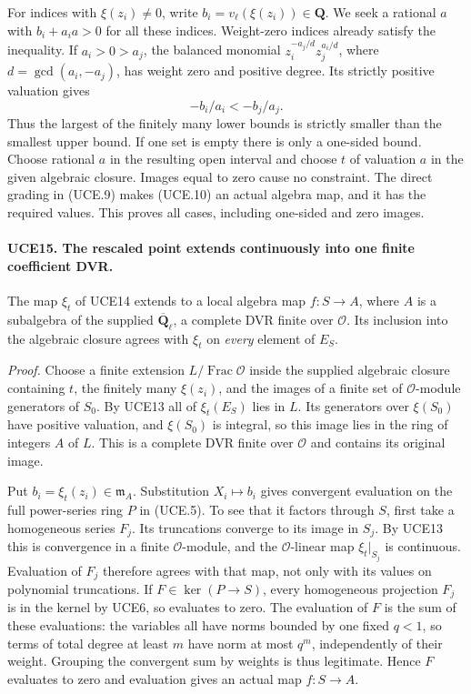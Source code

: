 For indices with \(\xi(z_i)\ne0\), write
\(b_i=v_\ell(\xi(z_i))\in\mathbf Q\).  We seek a rational
\(a\) with \(b_i+a_i a>0\) for all these indices.  Weight-zero
indices already satisfy the inequality.  If \(a_i>0>a_j\), the
balanced monomial
\(z_i^{-a_j/d}z_j^{a_i/d}\), where \(d=\gcd(a_i,-a_j)\),
has weight zero and positive degree.  Its strictly positive
valuation gives
\[
                       -b_i/a_i<-b_j/a_j.
 \tag{UCE.11}
\]
Thus the largest of the finitely many lower bounds is strictly
smaller than the smallest upper bound.  If one set is empty there
is only a one-sided bound.  Choose rational \(a\) in the resulting
open interval and choose \(t\) of valuation \(a\) in the given
algebraic closure.  Images equal to zero cause no constraint.
The direct grading in (UCE.9) makes (UCE.10) an actual algebra
map, and it has the required values.  This proves all cases,
including one-sided and zero images.

\paragraph{UCE15. The rescaled point extends continuously into one finite coefficient DVR.}
\label{claim:UCE15}
The map \(\xi_t\) of UCE14 extends to a local algebra map
\(f:S\to A\), where \(A\) is a subalgebra of the supplied
\(\overline{\mathbf Q}_\ell\), a complete DVR finite over
\(\mathcal O\).  Its inclusion into the algebraic closure agrees
with \(\xi_t\) on \emph{every} element of \(E_S\).

\emph{Proof.}
Choose a finite extension \(L/\operatorname{Frac}\mathcal O\)
inside the supplied algebraic closure containing \(t\), the
finitely many \(\xi(z_i)\), and the images of a finite set of
\(\mathcal O\)-module generators of \(S_0\).  By UCE13 all
of \(\xi_t(E_S)\) lies in \(L\).  Its generators over
\(\xi(S_0)\) have positive valuation, and \(\xi(S_0)\)
is integral, so this image lies in the ring of integers \(A\)
of \(L\).  This is a complete DVR finite over \(\mathcal O\)
and contains its original image.

Put \(b_i=\xi_t(z_i)\in\mathfrak m_A\).  Substitution
\(X_i\mapsto b_i\) gives convergent evaluation on the full
power-series ring \(P\) in (UCE.5).  To see that it factors
through \(S\), first take a homogeneous series \(F_j\).
Its truncations converge to its image in \(S_j\).  By UCE13
this is convergence in a finite \(\mathcal O\)-module, and
the \(\mathcal O\)-linear map \(\xi_t|_{S_j}\) is continuous.
Evaluation of \(F_j\) therefore agrees with that map, not only
with its values on polynomial truncations.
If \(F\in\ker(P\to S)\), every homogeneous projection
\(F_j\) is in the kernel by UCE6, so evaluates to zero.
The evaluation of \(F\) is the sum of these evaluations:
the variables all have norms bounded by one fixed \(q<1\),
so terms of total degree at least \(m\) have norm at most
\(q^m\), independently of their weight.  Grouping the convergent
sum by weights is thus legitimate.  Hence \(F\) evaluates to
zero and evaluation gives an actual map \(f:S\to A\).


